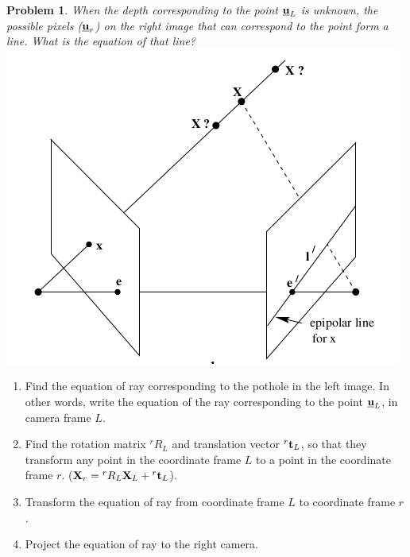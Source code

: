 \documentclass[times,singlecolumn]{article}
\newcommand{\ubfu}{\underline{\bfu}}
\newtheorem{prob}{Problem}
\begin{document}
\begin{prob}
  When the depth corresponding to the point $\ubfu_L$ is unknown, the possible
  pixels ($\ubfu_r$) on the right image that can correspond to  the point form a
  line. What is the equation of that line?
  \\
  \includegraphics[width=0.5\linewidth]{media/epipolar-line.png}
\end{prob}

\begin{enumerate}
\item Find the equation of ray corresponding to the pothole in the left image.
  In other words, write the equation of the ray corresponding to the point
  $\ubfu_L$, in camera frame $L$.
  \vspace{10em}

\item Find the rotation matrix ${}^rR_L$ and translation vector ${}^r\mathbf{t}_L$, so
  that they transform any point in the coordinate frame $L$ to a point in the
  coordinate frame $r$. ($\mathbf{X}_r = {}^rR_L \mathbf{X}_L + {}^r\mathbf{t}_L$).
  \vspace{10em}

\item Transform the equation of ray from coordinate frame $L$ to coordinate
  frame $r$.
  \vspace{10em}

\item Project the equation of ray to the right camera.
  \vspace{10em}

\end{enumerate}
\end{document}
